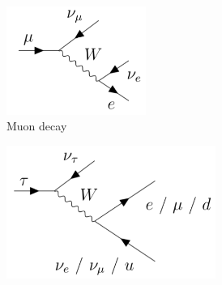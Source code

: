 \begin{figure}[hp]
	\centering
	\begin{subfigure}[t]{0.49\textwidth}
	\centering
	\includegraphics[width=0.5\textwidth]{Figures/5/mu_decay.pdf}
%
%				
%				
%
	\caption{Muon decay}
	\label{fig:muon_decay}
	\end{subfigure}
	\begin{subfigure}[t]{0.49\textwidth}
	\centering
	\includegraphics[width=0.75\textwidth]{Figures/5/tau_decays.pdf}

\end{subfigure}
\end{figure}
